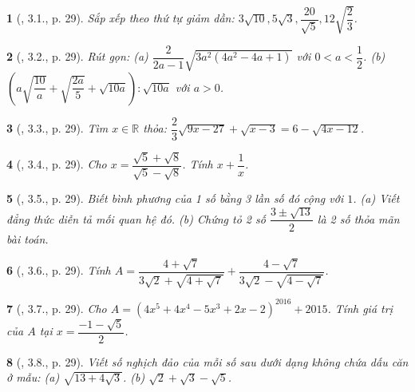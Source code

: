 \documentclass{article}
\newtheorem{baitoan}{}%
\begin{document}
\begin{baitoan}[\cite{Binh_boi_duong_Toan_9_tap_1}, 3.1., p. 29]
	Sắp xếp theo thứ tự giảm dần: $3\sqrt{10},5\sqrt{3},\dfrac{20}{\sqrt{5}},12\sqrt{\dfrac{2}{3}}$.
\end{baitoan}

\begin{baitoan}[\cite{Binh_boi_duong_Toan_9_tap_1}, 3.2., p. 29]
	Rút gọn: (a) $\dfrac{2}{2a - 1}\sqrt{3a^2(4a^2 - 4a + 1)}$ với $0 < a < \dfrac{1}{2}$. (b) $\left(a\sqrt{\dfrac{10}{a}} + \sqrt{\dfrac{2a}{5}} + \sqrt{10a}\right):\sqrt{10a}$ với $a > 0$.
\end{baitoan}

\begin{baitoan}[\cite{Binh_boi_duong_Toan_9_tap_1}, 3.3., p. 29]
	Tìm $x\in\mathbb{R}$ thỏa: $\dfrac{2}{3}\sqrt{9x - 27} + \sqrt{x - 3} = 6 - \sqrt{4x - 12}$.
\end{baitoan}

\begin{baitoan}[\cite{Binh_boi_duong_Toan_9_tap_1}, 3.4., p. 29]
	Cho $x = \dfrac{\sqrt{5} + \sqrt{8}}{\sqrt{5} - \sqrt{8}}$. Tính $x + \dfrac{1}{x}$.
\end{baitoan}

\begin{baitoan}[\cite{Binh_boi_duong_Toan_9_tap_1}, 3.5., p. 29]
	Biết bình phương của 1 số bằng 3 lần số đó cộng với $1$. (a) Viết đẳng thức diễn tả mối quan hệ đó. (b) Chứng tỏ 2 số $\dfrac{3\pm\sqrt{13}}{2}$ là 2 số thỏa mãn bài toán.
\end{baitoan}

\begin{baitoan}[\cite{Binh_boi_duong_Toan_9_tap_1}, 3.6., p. 29]
	Tính $A = \dfrac{4 + \sqrt{7}}{3\sqrt{2} + \sqrt{4 + \sqrt{7}}} + \dfrac{4 - \sqrt{7}}{3\sqrt{2} - \sqrt{4 - \sqrt{7}}}$.
\end{baitoan}

\begin{baitoan}[\cite{Binh_boi_duong_Toan_9_tap_1}, 3.7., p. 29]
	Cho $A = (4x^5 + 4x^4 - 5x^3 + 2x - 2)^{2016} + 2015$. Tính giá trị của $A$ tại $x = \dfrac{-1 - \sqrt{5}}{2}$.
\end{baitoan}

\begin{baitoan}[\cite{Binh_boi_duong_Toan_9_tap_1}, 3.8., p. 29]
	Viết số nghịch đảo của mỗi số sau dưới dạng không chứa dấu căn ở mẫu: (a) $\sqrt{13 + 4\sqrt{3}}$. (b) $\sqrt{2} + \sqrt{3} - \sqrt{5}$.
\end{baitoan}
\end{document}
